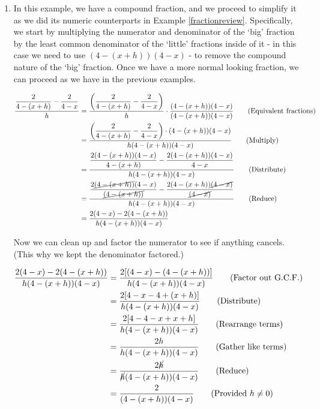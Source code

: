 \begin{ex}
\begin{enumerate}
We would like to factor the numerator and cancel factors it has in common with the denominator.  After a few attempts, it appears as if the numerator doesn't factor, at least over the integers.  As a check, we compute the discriminant of $2y^2 + 15y + 4$ and get $15^2 - 4(2)(4) = 193$.  This isn't a perfect square so we know that the quadratic equation $2y^2 + 15y + 4=0$ has irrational solutions. This means $2y^2 + 15y + 4$  can't factor over the integers\footnote{See the remarks following Theorem \ref{discriminanttheoremrealversion}.} so we are done.  

\item  In this example, we have a compound fraction, and we proceed to simplify it as we did its numeric counterparts in Example \ref{fractionreview}.  Specifically, we start by multiplying the numerator and denominator of the `big' fraction by the least common denominator of the `little' fractions inside of it - in this case we need to use $(4-(x+h))(4-x)$ - to remove the compound nature of the `big' fraction.  Once we have a more normal looking fraction, we can proceed as we have in the previous examples.

\begin{align*}
\dfrac{\dfrac{2}{4 - (x+h)} - \dfrac{2}{4-x}}{h} & = \dfrac{\left(\dfrac{2}{4 - (x+h)} - \dfrac{2}{4-x}\right)}{h}  \cdot \dfrac{(4-(x+h))(4-x)}{(4-(x+h))(4-x)} \tag{Equivalent fractions} \\ 
& = \dfrac{\left(\dfrac{2}{4 - (x+h)} - \dfrac{2}{4-x}\right) \cdot (4-(x+h))(4-x) }{h (4-(x+h))(4-x)} \tag{Multiply} \\ 
& = \dfrac{\dfrac{2(4-(x+h))(4-x)}{4 - (x+h)} - \dfrac{2(4-(x+h))(4-x)}{4-x}}{h (4-(x+h))(4-x)} \tag{Distribute} \\ 
& = \dfrac{\dfrac{2\cancel{(4-(x+h))}(4-x)}{\cancel{(4 - (x+h))}} - \dfrac{2(4-(x+h))\cancel{(4-x)}}{\cancel{(4-x)}}}{h (4-(x+h))(4-x)} \tag{Reduce} \\ 
& = \dfrac{2(4-x) - 2(4-(x+h))}{h(4-(x+h))(4-x)} \\ 
\end{align*}

Now we can clean up and factor the numerator to see if anything cancels.  (This why we kept the denominator factored.)

\begin{align*}
\dfrac{2(4-x) - 2(4-(x+h))}{h(4-(x+h))(4-x)} & = \dfrac{2[(4-x) - (4-(x+h))]}{h(4-(x+h))(4-x)} \tag{Factor out G.C.F.} \\
& = \dfrac{2[4-x - 4+(x+h)]}{h(4-(x+h))(4-x)} \tag{Distribute} \\
& = \dfrac{2[4- 4 - x+x+h]}{h(4-(x+h))(4-x)} \tag{Rearrange terms} \\
& = \dfrac{2h}{h(4-(x+h))(4-x)} \tag{Gather like terms} \\
& = \dfrac{2\cancel{h}}{\cancel{h}(4-(x+h))(4-x)} \tag{Reduce} \\
& = \dfrac{2}{(4-(x+h))(4-x)} \tag{Provided $h \neq 0$} \\
\end{align*}


\end{enumerate}
\end{ex}
